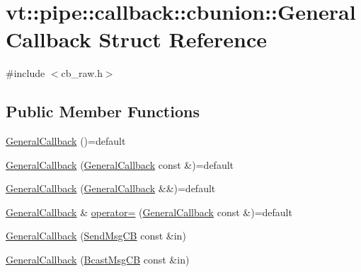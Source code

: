 \hypertarget{structvt_1_1pipe_1_1callback_1_1cbunion_1_1_general_callback}{}\section{vt\+:\+:pipe\+:\+:callback\+:\+:cbunion\+:\+:General\+Callback Struct Reference}
\label{structvt_1_1pipe_1_1callback_1_1cbunion_1_1_general_callback}


{\ttfamily \#include $<$cb\+\_\+raw.\+h$>$}

\subsection*{Public Member Functions}
\begin{DoxyCompactItemize}
\item 
\hyperlink{structvt_1_1pipe_1_1callback_1_1cbunion_1_1_general_callback_a7249abce459f2922bc2454bb45ea1eb4}{General\+Callback} ()=default
\item 
\hyperlink{structvt_1_1pipe_1_1callback_1_1cbunion_1_1_general_callback_a4c3b634eddc0faa5316aabb0baf0f355}{General\+Callback} (\hyperlink{structvt_1_1pipe_1_1callback_1_1cbunion_1_1_general_callback}{General\+Callback} const \&)=default
\item 
\hyperlink{structvt_1_1pipe_1_1callback_1_1cbunion_1_1_general_callback_a0c347ae7b7f762e55419717546fc74f4}{General\+Callback} (\hyperlink{structvt_1_1pipe_1_1callback_1_1cbunion_1_1_general_callback}{General\+Callback} \&\&)=default
\item 
\hyperlink{structvt_1_1pipe_1_1callback_1_1cbunion_1_1_general_callback}{General\+Callback} \& \hyperlink{structvt_1_1pipe_1_1callback_1_1cbunion_1_1_general_callback_ab215aecc57d3f016b1049af5cabeb78c}{operator=} (\hyperlink{structvt_1_1pipe_1_1callback_1_1cbunion_1_1_general_callback}{General\+Callback} const \&)=default
\item 
\hyperlink{structvt_1_1pipe_1_1callback_1_1cbunion_1_1_general_callback_a5aac57c4d6a5c61be2619e64afc29083}{General\+Callback} (\hyperlink{structvt_1_1pipe_1_1callback_1_1cbunion_1_1_send_msg_c_b}{Send\+Msg\+CB} const \&in)
\item 
\hyperlink{structvt_1_1pipe_1_1callback_1_1cbunion_1_1_general_callback_aa779a3be297b55c3cfbc9c98a3d1b56f}{General\+Callback} (\hyperlink{structvt_1_1pipe_1_1callback_1_1cbunion_1_1_bcast_msg_c_b}{Bcast\+Msg\+CB} const \&in)
\item 

\end{DoxyCompactItemize}
